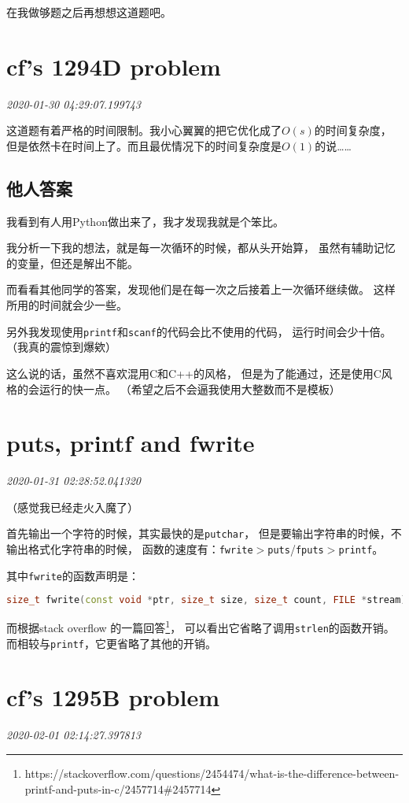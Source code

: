 \documentclass{peterlitsdoc}
\newcommand{\timetx}[1]
    {\par\noindent\emph{\pltgray\small #1}\vspace{2em}}
\newcommand{\vb}{\verb}
\begin{document}
在我做够题之后再想想这道题吧。


\section{cf's 1294D problem}\timetx{2020-01-30 04:29:07.199743}

这道题有着严格的时间限制。我小心翼翼的把它优化成了$O(s)$的时间复杂度，
但是依然卡在时间上了。而且最优情况下的时间复杂度是$O(1)$的说\ldots\ldots

\subsection{他人答案}
我看到有人用Python做出来了，我才发现我就是个笨比。

我分析一下我的想法，就是每一次循环的时候，都从头开始算，
虽然有辅助记忆的变量，但还是解出不能。

而看看其他同学的答案，发现他们是在每一次之后接着上一次循环继续做。
这样所用的时间就会少一些。

另外我发现使用\vb|printf|和\vb|scanf|的代码会比不使用的代码，
运行时间会少十倍。（我真的震惊到爆欸）

这么说的话，虽然不喜欢混用C和C++的风格，
但是为了能通过，还是使用C风格的会运行的快一点。
（希望之后不会逼我使用大整数而不是模板）


\section{puts, printf and fwrite}\timetx{2020-01-31 02:28:52.041320}

（感觉我已经走火入魔了）

首先输出一个字符的时候，其实最快的是\vb|putchar|，
但是要输出字符串的时候，不输出格式化字符串的时候，
函数的速度有：\vb|fwrite|$>$\vb|puts|/\vb|fputs|$>$\vb|printf|。

其中\vb|fwrite|的函数声明是：
\begin{lstlisting}[language=C++]
size_t fwrite(const void *ptr, size_t size, size_t count, FILE *stream);
\end{lstlisting}

而根据stack overflow
的一篇回答\footnote{https://stackoverflow.com/questions/2454474/what-is-the-difference-between-printf-and-puts-in-c/2457714\#2457714}，
可以看出它省略了调用\vb|strlen|的函数开销。
而相较与\vb|printf|，它更省略了其他的开销。


\section{cf's 1295B problem}\timetx{2020-02-01 02:14:27.397813}
\end{document}
